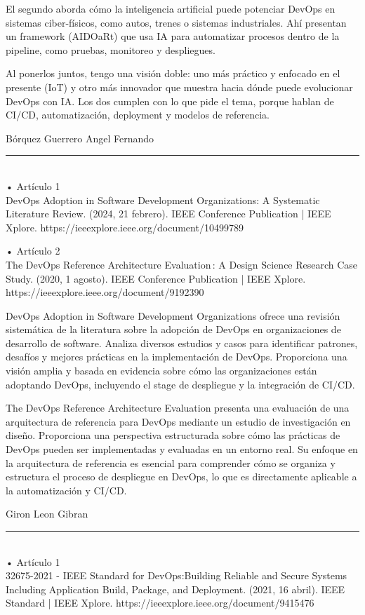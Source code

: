 \documentclass[12pt,a4paper]{article}
\begin{document}
El segundo aborda cómo la inteligencia artificial puede potenciar DevOps en sistemas ciber-físicos, como autos, trenes o sistemas industriales. Ahí presentan un framework (AIDOaRt) que usa IA para automatizar procesos dentro de la pipeline, como pruebas, monitoreo y despliegues.

Al ponerlos juntos, tengo una visión doble: uno más práctico y enfocado en el presente (IoT) y otro más innovador que muestra hacia dónde puede evolucionar DevOps con IA. Los dos cumplen con lo que pide el tema, porque hablan de CI/CD, automatización, deployment y modelos de referencia.



\vspace{1.5cm}
Bórquez Guerrero Angel Fernando \\
\rule{\linewidth}{0.3mm} \\
• Artículo 1 \\
DevOps Adoption in Software Development Organizations: A Systematic Literature Review. (2024, 21 febrero). IEEE Conference Publication | IEEE Xplore. https://ieeexplore.ieee.org/document/10499789

• Artículo 2 \\
The DevOps Reference Architecture Evaluation : A Design Science Research Case Study. (2020, 1 agosto). IEEE Conference Publication | IEEE Xplore. https://ieeexplore.ieee.org/document/9192390

DevOps Adoption in Software Development Organizations ofrece una revisión sistemática de la literatura sobre la adopción de DevOps en organizaciones de desarrollo de software. Analiza diversos estudios y casos para identificar patrones, desafíos y mejores prácticas en la implementación de DevOps. Proporciona una visión amplia y basada en evidencia sobre cómo las organizaciones están adoptando DevOps, incluyendo el stage de despliegue y la integración de CI/CD.

The DevOps Reference Architecture Evaluation presenta una evaluación de una arquitectura de referencia para DevOps mediante un estudio de investigación en diseño. Proporciona una perspectiva estructurada sobre cómo las prácticas de DevOps pueden ser implementadas y evaluadas en un entorno real. Su enfoque en la arquitectura de referencia es esencial para comprender cómo se organiza y estructura el proceso de despliegue en DevOps, lo que es directamente aplicable a la automatización y CI/CD.

\newpage
Giron Leon Gibran \\
\rule{\linewidth}{0.3mm} \\
• Artículo 1 \\
32675-2021 - IEEE Standard for DevOps:Building Reliable and Secure Systems Including Application Build, Package, and Deployment. (2021, 16 abril). IEEE Standard | IEEE Xplore. https://ieeexplore.ieee.org/document/9415476
\end{document}
